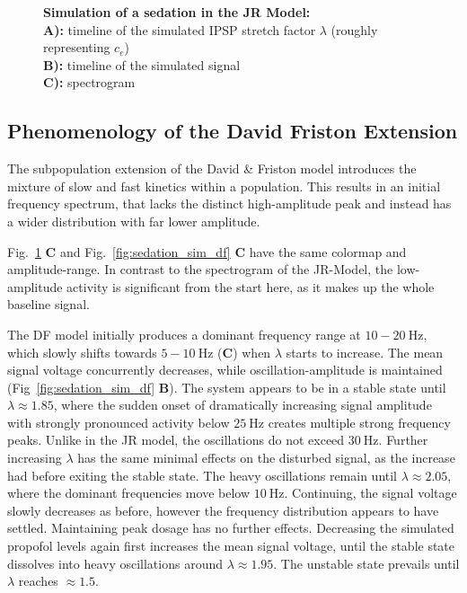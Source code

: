\begin{figure}[H]

\caption{\textbf{Simulation of a sedation in the JR Model:} \\
        \textbf{A):} timeline of the simulated IPSP stretch factor $\lambda$ (roughly representing $c_e$) \\
        \textbf{B):} timeline of the simulated signal \\
        \textbf{C):} spectrogram
}\label{fig:sedation_sim_jr}
\end{figure}

\toggletrue{drawLocRoc}
\def\simRunName{DF_LONGER_INIT}
\def\locStart{1.85}
\def\locST{16.17}
\def\locEnd{2.05}
\def\locET{18.72}
\def\rocStart{1.95}
\def\rocST{49.3}
\def\rocEnd{1.5}
\def\rocET{55.03}
\subsection{Phenomenology of the David Friston Extension}
    The subpopulation extension of the David \& Friston model introduces the mixture of slow and fast kinetics within
    a population.
    This results in an initial frequency spectrum,
    that lacks the distinct high-amplitude peak and instead has a wider distribution with far lower amplitude.
\begin{remark}
    Fig.~\ref{fig:sedation_sim_jr} \textbf{C} and Fig.~\ref{fig:sedation_sim_df} \textbf{C} have the same
    colormap and amplitude-range.
    In contrast to the spectrogram of the JR-Model,
    the low-amplitude activity is significant from the start here,
    as it makes up the whole baseline signal.
\end{remark}

    The DF model initially produces a dominant frequency range at $10-20 \SI{}{\hertz} $,
    which slowly shifts towards $ 5-10 \SI{}{\hertz} $ (\textbf{C}) when $\lambda$ starts to increase.
    The mean signal voltage concurrently decreases,
    while oscillation-amplitude is maintained (Fig~\ref{fig:sedation_sim_df} \textbf{B}).
    The system appears to be in a stable state until $ \lambda \approx \locStart $,
    where the sudden onset of dramatically
    increasing signal amplitude with strongly pronounced activity below $ \SI{25}{\hertz} $
    creates multiple strong frequency peaks.
    Unlike in the JR model, the oscillations do not exceed  $ \SI{30}{\hertz} $.
    Further increasing $\lambda$ has the same minimal effects on the disturbed signal,
    as the increase had before exiting the stable state.
    The heavy oscillations remain until $\lambda \approx \locEnd $,
    where the dominant frequencies move below $\SI{10}{\hertz}$.
    Continuing, the signal voltage slowly decreases as before,
    however the frequency distribution appears to have settled.
    Maintaining peak dosage has no further effects.
    Decreasing the simulated propofol levels again first increases the mean signal voltage,
    until the stable state dissolves into heavy oscillations around $\lambda \approx \rocStart$.
    The unstable state prevails until $\lambda$ reaches $\approx \rocEnd$.


